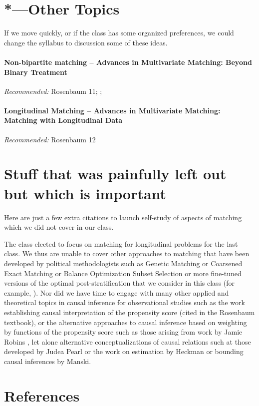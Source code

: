 \documentclass[10pt]{article}
\begin{document}
\citealp[Chap 4]{rosenbaum:2002}

\citealp[Chap 3, 14]{rosenbaum2010design}

\cite{imbens2003sea}


\section{*---Other Topics}

If we move quickly, or if the class has some organized preferences, we could
change the syllabus to discussion some of these ideas.


\paragraph{Non-bipartite matching -- Advances in Multivariate Matching: Beyond Binary Treatment }

\emph{Recommended:}  Rosenbaum 11; \cite{lu2011optimal};\cite{imaivandyk:04}

\paragraph{Longitudinal Matching -- Advances in Multivariate Matching: Matching with Longitudinal Data}

\emph{Recommended:} Rosenbaum 12


\section{Stuff that was painfully left out but which is important}

Here are just a few extra citations to launch self-study of aspects of
matching which we did not cover in our class.

The class elected to focus on matching for longitudinal problems for
the last class. We thus are unable to cover other approaches to
matching that have been developed by political methodologists such as
Genetic Matching \citep{diamond2006genetic, sekhon2007multivariate} or
Coarsened Exact Matching \citep{iacus2009causal,
  iacus2011multivariate} or Balance Optimization Subset Selection
\citep{Nikolaevetal:12} or more fine-tuned versions of the optimal
post-stratification that we consider in this class (for example,
\citep{zubizarreta2012using}). Nor did we have time to engage with
many other applied and theoretical topics in causal inference for
observational studies such as the work establishing causal
interpretation of the propensity score (cited in the Rosenbaum
textbook), or the alternative approaches to causal inference based on
weighting by functions of the propensity score such as those arising
from work by Jamie Robins \citep{glynn2010introduction}, let alone
alternative conceptualizations of causal relations such at those
developed by Judea Pearl \citep{JudeaPearl2000a} or the work on
estimation by Heckman or bounding causal inferences by Manski.


\section{References}


\end{document}
